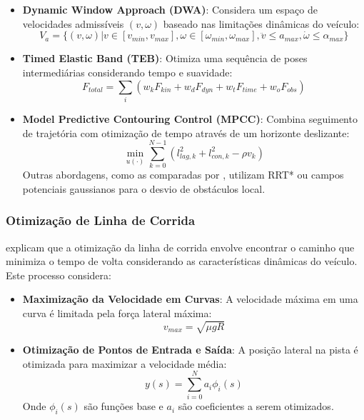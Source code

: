 \begin{itemize}
    \item \textbf{Dynamic Window Approach (DWA)}: Considera um espaço de velocidades admissíveis $(v, \omega)$ baseado nas limitações dinâmicas do veículo:
          \begin{equation}
              V_a = \{(v,\omega) | v \in [v_{min}, v_{max}], \omega \in [\omega_{min}, \omega_{max}], \ddot{v} \leq a_{max}, \dot{\omega} \leq \alpha_{max}\}
          \end{equation}

    \item \textbf{Timed Elastic Band (TEB)}: Otimiza uma sequência de poses intermediárias considerando tempo e suavidade:
          \begin{equation}
              F_{total} = \sum_{i} (w_k F_{kin} + w_d F_{dyn} + w_t F_{time} + w_o F_{obs})
          \end{equation}

    \item \textbf{Model Predictive Contouring Control (MPCC)}: Combina seguimento de trajetória com otimização de tempo através de um horizonte deslizante:
          \begin{equation}
              \min_{u(\cdot)} \sum_{k=0}^{N-1} (l_{lag,k}^2 + l_{con,k}^2 - \rho v_{k})
          \end{equation}
          Outras abordagens, como as comparadas por \cite{Misra2024Report}, utilizam RRT* ou campos potenciais gaussianos para o desvio de obstáculos local.
\end{itemize}

\subsubsection{Otimização de Linha de Corrida}

\cite{OKelly2020F1TENTH} explicam que a otimização da linha de corrida envolve encontrar o caminho que minimiza o tempo de volta considerando as características dinâmicas do veículo. Este processo considera:

\begin{itemize}
    \item \textbf{Maximização da Velocidade em Curvas}: A velocidade máxima em uma curva é limitada pela força lateral máxima:
          \begin{equation}
              v_{max} = \sqrt{\mu g R}
          \end{equation}

    \item \textbf{Otimização de Pontos de Entrada e Saída}: A posição lateral na pista é otimizada para maximizar a velocidade média:
          \begin{equation}
              y(s) = \sum_{i=0}^N a_i \phi_i(s)
          \end{equation}
          Onde $\phi_i(s)$ são funções base e $a_i$ são coeficientes a serem otimizados.
\end{itemize}

